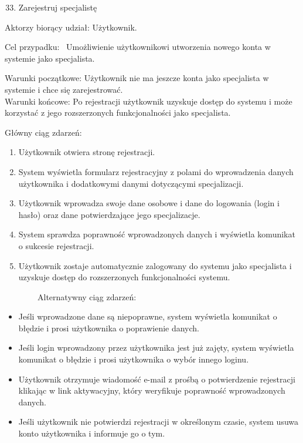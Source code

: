 {}

\begin{enumerate}
\setcounter{enumi}{32}
\tightlist
\item
  {Zarejestruj specjalistę}
\end{enumerate}

{Aktorzy biorący udział: Użytkownik.}

{Cel przypadku: ~Umożliwienie użytkownikowi utworzenia nowego konta w
systemie jako specjalista.}

{Warunki początkowe: Użytkownik nie ma jeszcze konta jako specjalista w
systemie i chce się zarejestrować.\\
Warunki końcowe: Po rejestracji użytkownik uzyskuje dostęp do systemu i
może korzystać z jego rozszerzonych funkcjonalności jako specjalista.}

{Główny ciąg zdarzeń:}

\begin{enumerate}
\tightlist
\item
  {Użytkownik otwiera stronę rejestracji.}
\item
  {System wyświetla formularz rejestracyjny z polami do wprowadzenia
  danych użytkownika i dodatkowymi danymi dotyczącymi specjalizacji.}
\item
  {Użytkownik wprowadza swoje dane osobowe i dane do logowania (login i
  hasło) oraz dane potwierdzające jego specjalizacje.}
\item
  {System sprawdza poprawność wprowadzonych danych i wyświetla komunikat
  o sukcesie rejestracji.}
\item
  {Użytkownik zostaje automatycznie zalogowany do systemu jako
  specjalista i uzyskuje dostęp do rozszerzonych funkcjonalności
  systemu.}
\end{enumerate}

{~~~~~~~~Alternatywny ciąg zdarzeń:}

\begin{itemize}
\tightlist
\item
  {Jeśli wprowadzone dane są niepoprawne, system wyświetla komunikat o
  błędzie i prosi użytkownika o poprawienie danych.}
\item
  {Jeśli login wprowadzony przez użytkownika jest już zajęty, system
  wyświetla komunikat o błędzie i prosi użytkownika o wybór innego
  loginu.}
\item
  {Użytkownik otrzymuje wiadomość e-mail z prośbą o potwierdzenie
  rejestracji klikając w link aktywacyjny, który weryfikuje poprawność
  wprowadzonych danych.}
\item
  {Jeśli użytkownik nie potwierdzi rejestracji w określonym czasie,
  system usuwa konto użytkownika i informuje go o tym.\\
  \strut \\
  }
\end{itemize}

